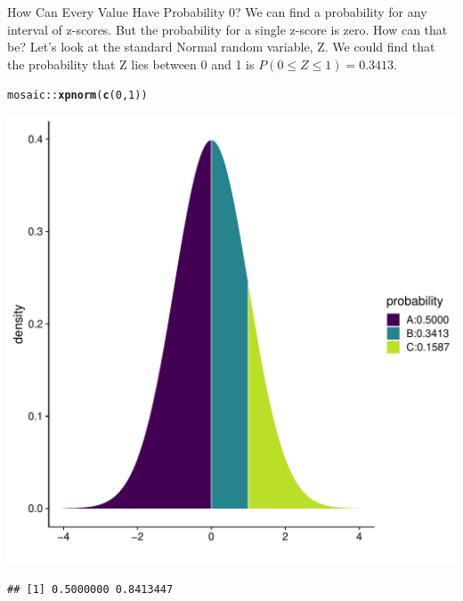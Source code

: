 \documentclass[10pt]{beamer}\usepackage[]{graphicx}\usepackage[]{color}
\makeatletter
\newcommand{\hlnum}[1]{\textcolor[rgb]{0.686,0.059,0.569}{#1}}%
\newcommand{\hlopt}[1]{\textcolor[rgb]{0,0,0}{#1}}%
\newcommand{\hlstd}[1]{\textcolor[rgb]{0.345,0.345,0.345}{#1}}%
\newcommand{\hlkwd}[1]{\textcolor[rgb]{0.737,0.353,0.396}{\textbf{#1}}}%
\newenvironment{kframe}{%
 \def\at@end@of@kframe{}%
 \ifinner\ifhmode%
  \def\at@end@of@kframe{\end{minipage}}%
  \begin{minipage}{\columnwidth}%
 \fi\fi%
 \def\FrameCommand##1{\hskip\@totalleftmargin \hskip-\fboxsep
 \colorbox{shadecolor}{##1}\hskip-\fboxsep
     \hskip-\linewidth \hskip-\@totalleftmargin \hskip\columnwidth}%
 \MakeFramed {\advance\hsize-\width
   \@totalleftmargin\z@ \linewidth\hsize
   \@setminipage}}%
 {\par\unskip\endMakeFramed%
 \at@end@of@kframe}
\newenvironment{knitrout}{}{} %
\makeatother
\begin{document}
\begin{frame}[fragile]{How Can Every Value Have Probability 0?}
We can find a probability for any interval of z-scores. But the
probability for a single z-score is zero. How can that be? Let's
look at the standard Normal random variable, Z. We could
find that the
probability that Z lies between 0 and 1 is $P(0 \leq Z \leq 1)=0.3413$.

\begin{knitrout}\tiny
{}\color{fgcolor}\begin{kframe}
\begin{alltt}
\hlstd{mosaic}\hlopt{::}\hlkwd{xpnorm}\hlstd{(}\hlkwd{c}\hlstd{(}\hlnum{0}\hlstd{,}\hlnum{1}\hlstd{))}
\end{alltt}
\end{kframe}

{\centering \includegraphics[width=0.60\linewidth]{figure/unnamed-chunk-1-1} 

}


\begin{kframe}\begin{verbatim}
## [1] 0.5000000 0.8413447
\end{verbatim}
\end{kframe}
\end{knitrout}
\end{frame}
\end{document}
